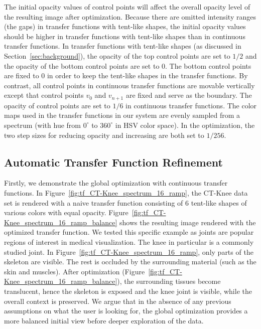 The initial opacity values of control points will affect the overall opacity level of the resulting image after optimization. Because there are omitted intensity ranges (the gaps) in transfer functions with tent-like shapes, the initial opacity values should be higher in transfer functions with tent-like shapes than in continuous transfer functions.
In transfer functions with tent-like shapes (as discussed in Section~\ref{sec:background}), the opacity of the top control points are set to $ 1/2 $ and the opacity of the bottom control points are set to 0. The bottom control points are fixed to 0 in order to keep the tent-like shapes in the transfer functions. By contrast, all control points in continuous transfer functions are movable vertically except that control points $ v_{0} $ and $ v_{n+1} $ are fixed and serve as the boundary. The opacity of control points are set to $ 1/6 $ in continuous transfer functions.
The color maps used in the transfer functions in our system are evenly sampled from a spectrum (with hue from $ 0^\circ $ to $ 360^\circ $ in HSV color space).
In the optimization, the two step sizes for reducing opacity and increasing are both set to $ 1/256 $.

\subsection{Automatic Transfer Function Refinement}
Firstly, we demonstrate the global optimization with continuous transfer functions.
In Figure~\ref{fig:tf_CT-Knee_spectrum_16_ramp}, the CT-Knee data set is rendered with a naive transfer function consisting of 6 tent-like shapes of various colors with equal opacity. Figure~\ref{fig:tf_CT-Knee_spectrum_16_ramp_balance} shows the resulting image rendered with the optimized transfer function.
We tested this specific example as joints are popular regions of interest in medical visualization.
The knee in particular is a commonly studied joint.
In Figure~\ref{fig:tf_CT-Knee_spectrum_16_ramp}, only parts of the skeleton are visible. The rest is occluded by the surrounding material (such as the skin and muscles).
After optimization (Figure~\ref{fig:tf_CT-Knee_spectrum_16_ramp_balance}), the surrounding tissues become translucent, hence the skeleton is exposed and the knee joint is visible, while the overall context is preserved. We argue that in the absence of any previous assumptions on what the user is looking for, the global optimization provides a more balanced initial view before deeper exploration of the data.

